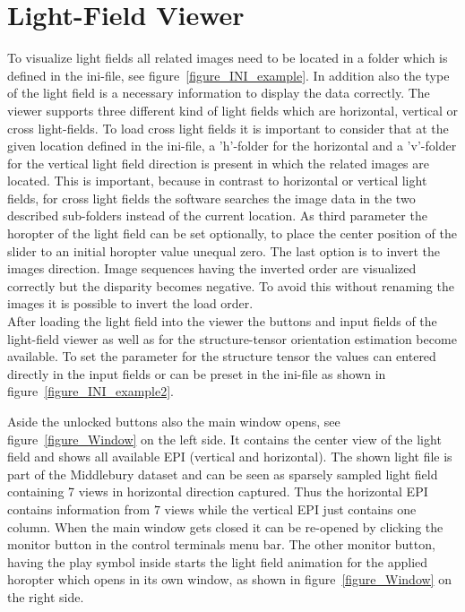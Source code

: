 \section{Light-Field Viewer}
%
To visualize light fields all related images need to be located in a folder which is defined in the ini-file, see figure~\ref{figure_INI_example}. 
%
In addition also the type of the light field is a necessary information to display the data correctly.
%
The viewer supports three different kind of light fields which are horizontal, vertical or cross light-fields.
%
To load cross light fields it is important to consider that at the given location defined in the ini-file, a 'h'-folder for the horizontal and a 'v'-folder for the vertical light field direction is present in which the related images are located.
%
This is important, because in contrast to horizontal or vertical light fields, for cross light fields the software searches the image data in the two described sub-folders instead of the current location. 
%
As third parameter the horopter of the light field can be set optionally, to place the center position of the slider to an initial horopter value unequal zero.
%
The last option is to invert the images direction.
%
Image sequences having the inverted order are visualized correctly but the disparity becomes negative.
%
To avoid this without renaming the images it is possible to invert the load order.
%
\vspace{2mm}
%
\\
%
After loading the light field into the viewer the buttons and input fields of the light-field viewer as well as for the structure-tensor orientation estimation become available.
%
To set the parameter for the structure tensor the values can entered directly in the input  fields or can be preset in the ini-file as shown in figure~\ref{figure_INI_example2}.
%

%
Aside the unlocked buttons also the main window opens, see figure~\ref{figure_Window} on the left side.
% 
It contains the center view of the light field and shows all available EPI (vertical and horizontal).
% 
The shown light file is part of the Middlebury dataset and can be seen as sparsely sampled light field containing 7 views in horizontal direction captured.
%
Thus the horizontal EPI contains information from $7$ views while the vertical EPI just contains one column. 
%
When the main window gets closed it can be re-opened by clicking the monitor button in the control terminals menu bar.
%
The other monitor button, having the play symbol inside starts the light field animation for the applied horopter which opens in its own window, as shown in figure~\ref{figure_Window} on the right side. 
